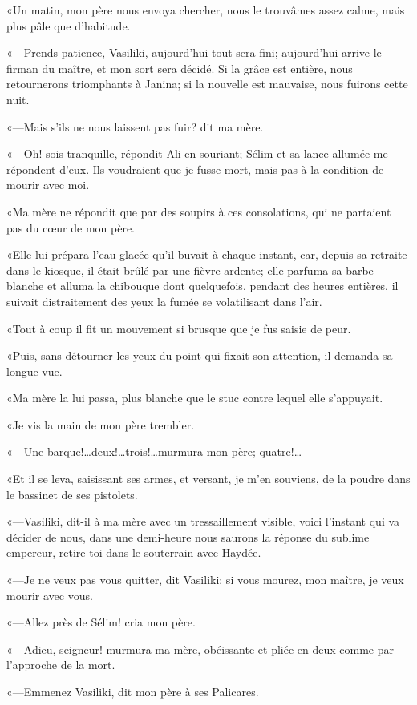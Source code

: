 «Un matin, mon père nous envoya chercher, nous le trouvâmes assez calme, mais plus pâle que d'habitude. 

«—Prends patience, Vasiliki, aujourd'hui tout sera fini; aujourd'hui arrive le firman du maître, et mon sort sera décidé. Si la grâce est entière, nous retournerons triomphants à Janina; si la nouvelle est mauvaise, nous fuirons cette nuit. 

«—Mais s'ils ne nous laissent pas fuir? dit ma mère. 

«—Oh! sois tranquille, répondit Ali en souriant; Sélim et sa lance allumée me répondent d'eux. Ils voudraient que je fusse mort, mais pas à la condition de mourir avec moi. 

«Ma mère ne répondit que par des soupirs à ces consolations, qui ne partaient pas du cœur de mon père. 

«Elle lui prépara l'eau glacée qu'il buvait à chaque instant, car, depuis sa retraite dans le kiosque, il était brûlé par une fièvre ardente; elle parfuma sa barbe blanche et alluma la chibouque dont quelquefois, pendant des heures entières, il suivait distraitement des yeux la fumée se volatilisant dans l'air. 

«Tout à coup il fit un mouvement si brusque que je fus saisie de peur. 

«Puis, sans détourner les yeux du point qui fixait son attention, il demanda sa longue-vue. 

«Ma mère la lui passa, plus blanche que le stuc contre lequel elle s'appuyait. 

«Je vis la main de mon père trembler.  

«—Une barque!\dots deux!\dots trois!\dots murmura mon père; quatre!\dots 

«Et il se leva, saisissant ses armes, et versant, je m'en souviens, de la poudre dans le bassinet de ses pistolets. 

«—Vasiliki, dit-il à ma mère avec un tressaillement visible, voici l'instant qui va décider de nous, dans une demi-heure nous saurons la réponse du sublime empereur, retire-toi dans le souterrain avec Haydée. 

«—Je ne veux pas vous quitter, dit Vasiliki; si vous mourez, mon maître, je veux mourir avec vous. 

«—Allez près de Sélim! cria mon père. 

«—Adieu, seigneur! murmura ma mère, obéissante et pliée en deux comme par l'approche de la mort. 

«—Emmenez Vasiliki, dit mon père à ses Palicares. 

